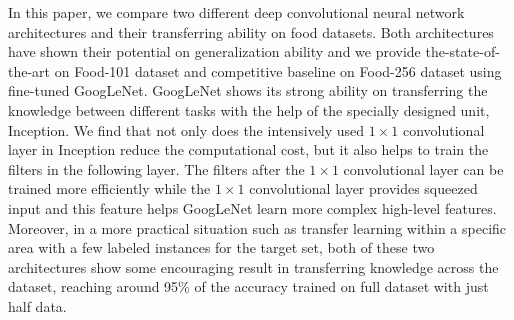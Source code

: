 In this paper, we compare two different deep convolutional neural network architectures and their transferring ability on food datasets. Both architectures have shown their potential on generalization ability and we provide the-state-of-the-art on Food-101 dataset and competitive baseline on Food-256 dataset using fine-tuned GoogLeNet. GoogLeNet shows its strong ability on transferring the knowledge between different tasks with the help of the specially designed unit, Inception. 
We find that not only does the intensively used $1\times 1$ convolutional layer in Inception reduce the computational cost, but it also helps to train the filters in the following layer. The filters after the $1\times 1$ convolutional layer can be trained more efficiently while the $1\times 1$ convolutional layer provides squeezed input and this feature helps GoogLeNet learn more complex high-level features.
Moreover, in a more practical situation such as transfer learning within a specific area with a few labeled instances for the target set, both of these two architectures show some encouraging result in transferring knowledge across the dataset, reaching around 95\% of the accuracy trained on full dataset with just half data.

